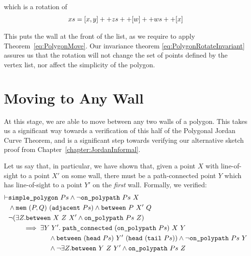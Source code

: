 which is a rotation of
\begin{displaymath}
  xs = [x,y] ++ zs ++ [w] ++ ws ++ [x]
\end{displaymath}

This puts the wall at the front of the list, as we require to apply Theorem~\ref{eq:PolygonMove}. Our invariance theorem \eqref{eq:PolygonRotateInvariant} assures us that the rotation will not change the set of points defined by the vertex list, nor affect the simplicity of the polygon.

\section{Moving to Any Wall}
At this stage, we are able to move between any two walls of a polygon. This takes us a significant way towards a verification of this half of the Polygonal Jordan Curve Theorem, and is a significant step towards verifying our alternative sketch proof from Chapter~\ref{chapter:JordanInformal}. 

Let us say that, in particular, we have shown that, given a point $X$ with line-of-sight to a point $X'$ on some wall, there must be a path-connected point $Y$ which has line-of-sight to a point $Y'$ on the \emph{first} wall. Formally, we verified:
\begin{equation}
  \begin{split}
\vdash    &\texttt{simple\_polygon}\ Ps \wedge \neg\texttt{on\_polypath}\ Ps\ X\\
    &\wedge \texttt{mem}\ (P,Q)\ (\texttt{adjacent}\ Ps) \wedge \texttt{between}\ P\ X'\ Q\\
    &\neg(\exists Z. \texttt{between}\ X\ Z\ X' \wedge \texttt{on\_polypath}\ Ps\ Z)\\
    &\qquad\implies \exists Y\; Y'.\; \texttt{path\_connected}\ (\texttt{on\_polypath}\ Ps)\ X\ Y\\
    &\qquad\qquad\qquad\wedge \texttt{between}\ (\texttt{head}\ Ps)\ Y'\ (\texttt{head}\ (\texttt{tail}\ Ps))\wedge\neg\texttt{on\_polypath}\ Ps\ Y\\
    &\qquad\qquad\qquad\wedge \neg\exists Z. \texttt{between}\ Y\ Z\ Y' \wedge \texttt{on\_polypath}\ Ps\ Z
  \end{split}
\end{equation}

